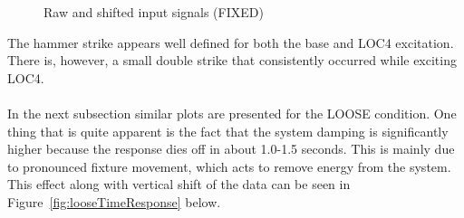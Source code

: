\documentclass[paper=a4, fontsize=12pt]{scrartcl} %
\begin{document}
%
	\begin{figure}[H]
		\centering
		\quad
		\caption{Raw and shifted input signals (FIXED)}
		\label{fig:weightInputResponse}
	\end{figure}
%
The hammer strike appears well defined for both the base and LOC4 excitation. There is, however, a small double strike that consistently occurred while exciting LOC4.
\\
\\
In the next subsection similar plots are presented for the LOOSE condition. One thing that is quite apparent is the fact that the system damping is significantly higher because the response dies off in about 1.0-1.5 seconds. This is mainly due to pronounced fixture movement, which acts to remove energy from the system. This effect along with vertical shift of the data can be seen in Figure~\ref{fig:looseTimeResponse} below.
%
\end{document}
